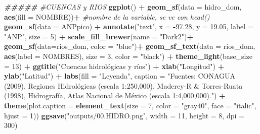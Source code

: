 \documentclass[
  11pt,
  letterpaper,
  DIV=11,
  numbers=noendperiod]{scrartcl}
\newenvironment{Shaded}{\begin{snugshade}}{\end{snugshade}}
\newcommand{\AttributeTok}[1]{\textcolor[rgb]{0.13,0.29,0.53}{#1}}
\newcommand{\CommentTok}[1]{\textcolor[rgb]{0.56,0.35,0.01}{\textit{#1}}}
\newcommand{\DecValTok}[1]{\textcolor[rgb]{0.00,0.00,0.81}{#1}}
\newcommand{\DocumentationTok}[1]{\textcolor[rgb]{0.56,0.35,0.01}{\textbf{\textit{#1}}}}
\newcommand{\FloatTok}[1]{\textcolor[rgb]{0.00,0.00,0.81}{#1}}
\newcommand{\FunctionTok}[1]{\textcolor[rgb]{0.13,0.29,0.53}{\textbf{#1}}}
\newcommand{\NormalTok}[1]{#1}
\newcommand{\SpecialCharTok}[1]{\textcolor[rgb]{0.81,0.36,0.00}{\textbf{#1}}}
\newcommand{\StringTok}[1]{\textcolor[rgb]{0.31,0.60,0.02}{#1}}
\begin{document}
\begin{Shaded}
\begin{Highlighting}[numbers=left,,]
\DocumentationTok{\#\#\#\#\#}
\CommentTok{\#CUENCAS y RIOS}
\FunctionTok{ggplot}\NormalTok{() }\SpecialCharTok{+}
  \FunctionTok{geom\_sf}\NormalTok{(}\AttributeTok{data =}\NormalTok{ hidro\_dom, }\FunctionTok{aes}\NormalTok{(}\AttributeTok{fill =}\NormalTok{ NOMBRE))}\SpecialCharTok{+} \CommentTok{\#nombre de la variable, se ve con head()}
  \FunctionTok{geom\_sf}\NormalTok{(}\AttributeTok{data =}\NormalTok{ ANPpico) }\SpecialCharTok{+}
  \FunctionTok{annotate}\NormalTok{(}\StringTok{"text"}\NormalTok{, }\AttributeTok{x =} \SpecialCharTok{{-}}\FloatTok{97.28}\NormalTok{, }\AttributeTok{y =} \FloatTok{19.05}\NormalTok{, }\AttributeTok{label =} \StringTok{"ANP"}\NormalTok{, }\AttributeTok{size =} \DecValTok{5}\NormalTok{) }\SpecialCharTok{+}
  \FunctionTok{scale\_fill\_brewer}\NormalTok{(}\AttributeTok{name =} \StringTok{"Dark2"}\NormalTok{)}\SpecialCharTok{+}
  \FunctionTok{geom\_sf}\NormalTok{(}\AttributeTok{data=}\NormalTok{rios\_dom, }\AttributeTok{color =} \StringTok{"blue"}\NormalTok{)}\SpecialCharTok{+}
  \FunctionTok{geom\_sf\_text}\NormalTok{(}\AttributeTok{data =}\NormalTok{ rios\_dom, }\FunctionTok{aes}\NormalTok{(}\AttributeTok{label =}\NormalTok{ NOMBRES), }\AttributeTok{size =} \DecValTok{3}\NormalTok{, }\AttributeTok{color =} \StringTok{"black"}\NormalTok{) }\SpecialCharTok{+}
  \FunctionTok{theme\_light}\NormalTok{(}\AttributeTok{base\_size =} \DecValTok{13}\NormalTok{) }\SpecialCharTok{+}
  \FunctionTok{ggtitle}\NormalTok{(}\StringTok{"Cuencas hidrológicas y ríos"}\NormalTok{) }\SpecialCharTok{+} \FunctionTok{xlab}\NormalTok{(}\StringTok{"Longitud"}\NormalTok{) }\SpecialCharTok{+} \FunctionTok{ylab}\NormalTok{(}\StringTok{"Latitud"}\NormalTok{) }\SpecialCharTok{+}
  \FunctionTok{labs}\NormalTok{(}\AttributeTok{fill =} \StringTok{"Leyenda"}\NormalTok{, }
      \AttributeTok{caption =} \StringTok{"Fuentes: CONAGUA (2009), Regiones Hidrológicas}
\StringTok{      (escala 1:250,000). Maderey{-}R \& Torres{-}Ruata (1998), Hidrografía, }
\StringTok{      Atlas Nacional de México (escala 1:4,000,000)."}\NormalTok{) }\SpecialCharTok{+}
  \FunctionTok{theme}\NormalTok{(}\AttributeTok{plot.caption =} \FunctionTok{element\_text}\NormalTok{(}\AttributeTok{size =} \DecValTok{7}\NormalTok{, }\AttributeTok{color =} \StringTok{"gray40"}\NormalTok{, }\AttributeTok{face =} \StringTok{"italic"}\NormalTok{, }\AttributeTok{hjust =} \DecValTok{1}\NormalTok{))}
\FunctionTok{ggsave}\NormalTok{(}\StringTok{"outputs/00.HIDRO.png"}\NormalTok{, }\AttributeTok{width =} \DecValTok{11}\NormalTok{, }\AttributeTok{height =} \DecValTok{8}\NormalTok{, }\AttributeTok{dpi =} \DecValTok{300}\NormalTok{)}
\end{Highlighting}
\end{Shaded}
\end{document}
